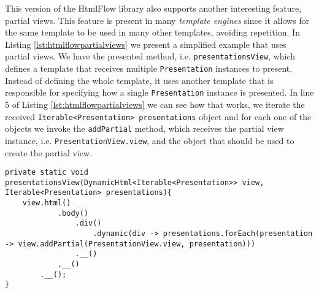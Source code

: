 \noindent
This version of the HtmlFlow library also supports another interesting feature, partial views. This feature is present in many \textit{template engines} since it allows for the same template to be used in many other templates, avoiding repetition. In Listing \ref{lst:htmlflowpartialviews} we present a simplified example that uses partial views. We have the presented method, i.e. \texttt{presentationsView}, which defines a template that receives multiple \texttt{Presentation} instances to present. Instead of defining the whole template, it uses another template that is responsible for specifying how a single \texttt{Presentation} instance is presented. In line 5 of Listing \ref{lst:htmlflowpartialviews} we can see how that works, we iterate the received \texttt{Iterable<Presentation> presentations} object and for each one of the objects we invoke the \texttt{addPartial} method, which receives the partial view instance, i.e. \texttt{PresentationView.view}, and the object that should be used to create the partial view.

\bigskip


\begin{minipage}{\linewidth}
\begin{lstlisting}[caption={HtmlFlow Partial Views},label={lst:htmlflowpartialviews}]
private static void presentationsView(DynamicHtml<Iterable<Presentation>> view, Iterable<Presentation> presentations){
    view.html()
            .body()
                .div()
                    .dynamic(div -> presentations.forEach(presentation -> view.addPartial(PresentationView.view, presentation)))
                .__()
            .__()
        .__();
}
\end{lstlisting}
\end{minipage}